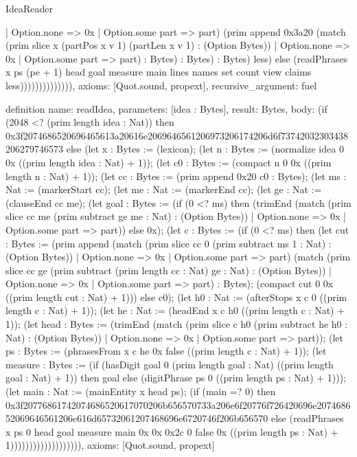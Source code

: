 \begin{lexlean}{IdeaReader}
\begin{semanticmodule}
{      | Option.none => 0x
      | Option.some part => part) (prim append 0x3a20 (match (prim slice x (partPos x v 1) (partLen x v 1) : (Option Bytes))
      | Option.none => 0x
      | Option.some part => part) : Bytes) : Bytes) : Bytes) less) else (readPhrases x ps (pe + 1) head goal measure main lines names set count view claims less)))))))))))))),
  axioms: [Quot.sound, propext],
  recursive_argument: fuel
}

definition{
  name: readIdea,
  parameters: [idea : Bytes],
  result: Bytes,
  body: (if (2048 <? (prim length idea : Nat)) then 0x3f2074686520696465613a20616e2069646561206973206174206d6f73742032303438206279746573 else (let x : Bytes := (lexicon); (let n : Bytes := (normalize idea 0 0x ((prim length idea : Nat) + 1)); (let c0 : Bytes := (compact n 0 0x ((prim length n : Nat) + 1)); (let cc : Bytes := (prim append 0x20 c0 : Bytes); (let ms : Nat := (markerStart cc); (let me : Nat := (markerEnd cc); (let ge : Nat := (clauseEnd cc me); (let goal : Bytes := (if (0 <? ms) then (trimEnd (match (prim slice cc me (prim subtract ge me : Nat) : (Option Bytes))
    | Option.none => 0x
    | Option.some part => part)) else 0x); (let c : Bytes := (if (0 <? ms) then (let cut : Bytes := (prim append (match (prim slice cc 0 (prim subtract ms 1 : Nat) : (Option Bytes))
    | Option.none => 0x
    | Option.some part => part) (match (prim slice cc ge (prim subtract (prim length cc : Nat) ge : Nat) : (Option Bytes))
    | Option.none => 0x
    | Option.some part => part) : Bytes); (compact cut 0 0x ((prim length cut : Nat) + 1))) else c0); (let h0 : Nat := (afterStops x c 0 ((prim length c : Nat) + 1)); (let he : Nat := (headEnd x c h0 ((prim length c : Nat) + 1)); (let head : Bytes := (trimEnd (match (prim slice c h0 (prim subtract he h0 : Nat) : (Option Bytes))
    | Option.none => 0x
    | Option.some part => part)); (let ps : Bytes := (phrasesFrom x c he 0x false ((prim length c : Nat) + 1)); (let measure : Bytes := (if (hasDigit goal 0 (prim length goal : Nat) ((prim length goal : Nat) + 1)) then goal else (digitPhrase ps 0 ((prim length ps : Nat) + 1))); (let main : Nat := (mainEntity x head ps); (if (main =? 0) then 0x3f20776861742074686520617070206b656570733a206e6f20776f726420696e207468652069646561206e616d65732061207468696e6720746f206b656570 else (readPhrases x ps 0 head goal measure main 0x 0x 0x2c 0 false 0x ((prim length ps : Nat) + 1))))))))))))))))))),
  axioms: [Quot.sound, propext]
}
\end{semanticmodule}
\end{lexlean}
